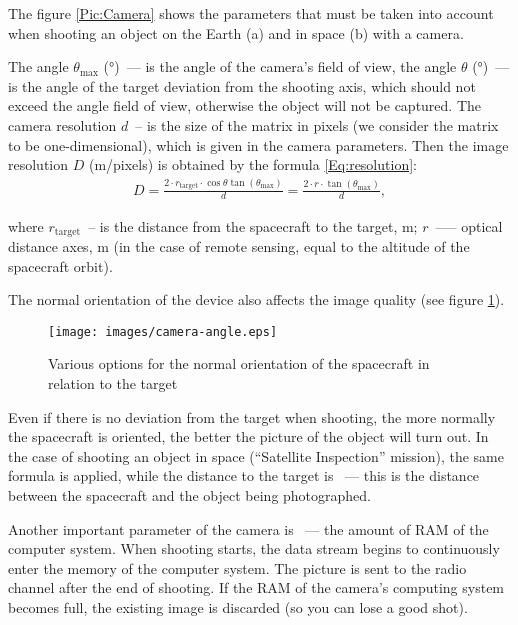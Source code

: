 \documentclass[12pt,a4paper]{article}
\begin{document}
The figure \ref{Pic:Camera} shows the parameters that must be taken into account when shooting an object on the Earth (a) and in space (b) with a camera.

The angle $\theta_{\text{max}}$ (°)~--- is the angle of the camera's field of view, the angle $\theta$ (°)~--- is the angle of the target deviation from the shooting axis, which should not exceed the angle field of view, otherwise the object will not be captured. The camera resolution $d$~-- is the size of the matrix in pixels (we consider the matrix to be one-dimensional), which is given in the camera parameters. Then the image resolution $D$ (m/pixels) is obtained by the formula \ref{Eq:resolution}:
\begin{eqnarray}
  D = \frac{2 \cdot r_{\text{target}}\cdot \cos{\theta}\tan{\left(\theta_{\text{max}}\right)}}{d} =
  \frac{2 \cdot r \cdot \tan{\left(\theta_{\text{max}}\right)}}{d},
  \label{Eq:resolution}
\end{eqnarray}

where $r_{\text{target}}$~-- is the distance from the spacecraft to the target, m; $r$~--— optical distance
axes, m (in the case of remote sensing, equal to the altitude of the spacecraft orbit).

The normal orientation of the device also affects the image quality (see figure
\ref{Pic:Camera-Angle}).

\begin{figure}[tbh]
  \begin{center}
    \texttt{[image: images/camera-angle.eps]}
    \caption{Various options for the normal orientation of the spacecraft in relation to the target}
    \label{Pic:Camera-Angle}
  \end{center}
\end{figure}

Even if there is no deviation from the target when shooting, the more normally the spacecraft is oriented, the better the picture of the object will turn out. In the case of shooting an object in space (“Satellite Inspection” mission), the same formula is applied, while the distance to the target is ~--- this is the distance between the spacecraft and the object being photographed.

Another important parameter of the camera is ~--- the amount of RAM of the computer system. When shooting starts, the data stream begins to continuously enter the memory of the computer system. The picture is sent to the radio channel after the end of shooting. If the RAM of the camera's computing system becomes full, the existing image is discarded (so you can lose a good shot).
\end{document}
